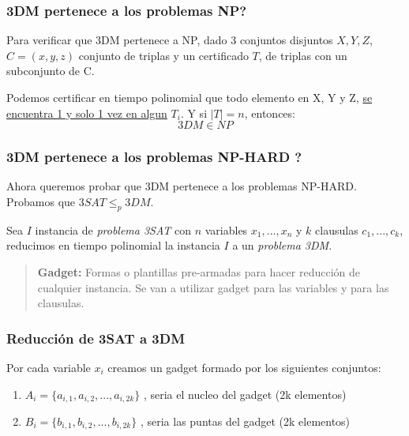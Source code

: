 \documentclass{article}
\begin{document}
\subsubsection{3DM pertenece a los problemas NP?}

Para verificar que 3DM pertenece a NP, dado 3 conjuntos disjuntos \(X, Y, Z\), \(C=(x,y,z)\) 
conjunto de triplas y un certificado \(T\), de triplas con un subconjunto de C.

Podemos certificar en tiempo polinomial que todo elemento en X, Y y Z, \underline{se encuentra 1 
y solo 1 vez en algun} \(T_i\). Y si \(|T|=n\), entonces:
\[
    3DM \in NP
\] 

\subsubsection{3DM pertenece a los problemas NP-HARD ?}

Ahora queremos probar que 3DM pertenece a los problemas NP-HARD. Probamos que \(3SAT \leq_p 3DM\).

Sea \(I\) instancia de \textit{problema 3SAT} con \(n\) variables \(x_1,...,x_n\) y \(k\) clausulas \(c_1,...,c_k\), 
reducimos en tiempo polinomial la instancia \(I\) a un \textit{problema 3DM}.

\begin{quote}
    \textbf{Gadget:} Formas o plantillas pre-armadas para hacer reducción de cualquier instancia. 
    Se van a utilizar gadget para las variables y para las clausulas.
\end{quote}

\subsubsection{Reducción de 3SAT a 3DM}

Por cada variable \(x_i\) creamos un gadget formado por los siguientes conjuntos:
\begin{enumerate}
    \item \(A_i=\{a_{i,1},a_{i,2},...,a_{i,2k}\}\) , seria el nucleo del gadget (2k elementos)
    \item \(B_i=\{b_{i,1},b_{i,2},...,b_{i,2k}\}\) , seria las puntas del gadget (2k elementos)
\end{enumerate}
\end{document}
